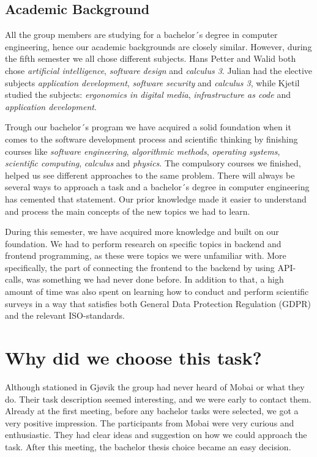 \subsection{Academic Background}
\label{section:academic background}
All the group members are studying for a bachelor´s degree in computer engineering, hence our academic backgrounds are closely similar. However, during the fifth semester we all chose different subjects. Hans Petter and Walid both chose \textit{artificial intelligence}, \textit{software design} and \textit{calculus 3}. Julian had the elective subjects \textit{application development}, \textit{software security} and \textit{calculus 3}, while Kjetil studied the subjects: \textit{ergonomics in digital media}, \textit{infrastructure as code} and \textit{application development}. 

Trough our bachelor´s program we have acquired a solid foundation when it comes to the software development process and scientific thinking by finishing courses like \textit{software engineering}, \textit{algorithmic methods}, \textit{operating systems}, \textit{scientific computing}, \textit{calculus} and \textit{physics}. The compulsory courses we finished, helped us see different approaches to the same problem. There will always be several ways to approach a task and a bachelor´s degree in computer engineering has cemented that statement. Our prior knowledge made it easier to understand and process the main concepts of the new topics we had to learn. 

During this semester, we have acquired more knowledge and built on our foundation. We had to perform research on specific topics in backend and frontend programming, as these were topics we were unfamiliar with. More specifically, the part of connecting the frontend to the backend by using API-calls, was something we had never done before. In addition to that, a high amount of time was also spent on learning how to conduct and perform scientific surveys in a way that satisfies both General Data Protection Regulation (GDPR) and the relevant ISO-standards.  

\section{Why did we choose this task?}
Although stationed in Gjøvik the group had never heard of Mobai or what they do. Their task description seemed interesting, and we were early to contact them. Already at the first meeting, before any bachelor tasks were selected, we got a very positive impression. The participants from Mobai were very curious and enthusiastic. They had clear ideas and suggestion on how we could approach the task. After this meeting, the bachelor thesis choice became an easy decision. 

